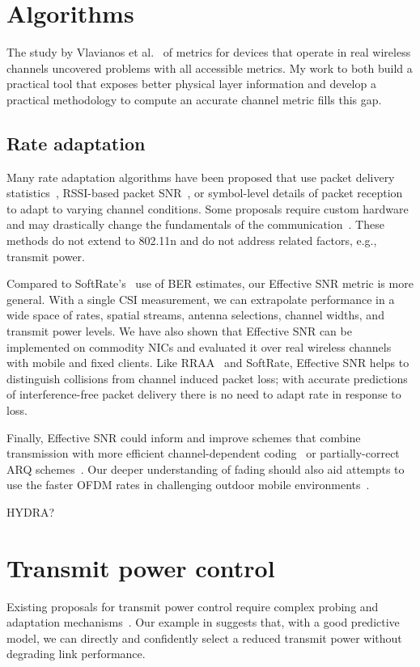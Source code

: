 \section{Algorithms}
The study by Vlavianos et al.~\cite{Vlavianos_metrics} of metrics for devices that operate in real wireless channels uncovered problems with all accessible metrics. My work to both build a practical tool that exposes better physical layer information and develop a practical methodology to compute an accurate channel metric fills this gap.

\subsection{Rate adaptation}
Many rate adaptation algorithms have been proposed that use packet delivery statistics~\cite{Bicket_SampleRate,Wong_RRAA}, RSSI-based packet SNR~\cite{Camp_rateadapt,Judd_CHARM}, or symbol-level details of packet reception~\cite{Sen_AccuRate,Vutukuru_SoftRate} to adapt to varying channel conditions. Some proposals require custom hardware~\cite{Camp_rateadapt} and may drastically change the fundamentals of the communication~\cite{Rahul_FARA}. These methods do not extend to 802.11n and do not address related factors, e.g., transmit power.

Compared to SoftRate's~\cite{Vutukuru_SoftRate} use of BER estimates, our Effective SNR metric is more general. With a single CSI measurement, we can extrapolate performance in a wide space of rates, spatial streams, antenna selections, channel widths, and transmit power levels. We have also shown that Effective SNR can be implemented on commodity NICs and evaluated it over real wireless channels with mobile and fixed clients. Like RRAA~\cite{Wong_RRAA} and SoftRate, Effective SNR helps to distinguish collisions from channel induced packet loss; with accurate predictions of interference-free packet delivery there is no need to adapt rate in response to loss.

Finally, Effective SNR could inform and improve schemes that combine transmission with more efficient channel-dependent coding~\cite{Lin_ZipTX} or partially-correct ARQ schemes~\cite{Jamieson_PPR}. Our deeper understanding of fading should also aid attempts to use the faster OFDM rates in challenging outdoor mobile environments~\cite{Eriksson_Cabernet}. %

HYDRA?~\cite{Kim_Hydra}

\section{Transmit power control}
Existing proposals for transmit power control require complex probing and adaptation mechanisms~\cite{Monks_PowerMAC,Ramachandran_Symphony,Son_PowerStudy}. Our %
example in  suggests 
that, with a good predictive model, we can directly and confidently select a reduced transmit power without degrading link performance. 

\ifx\mainfile\undefined

\fi
